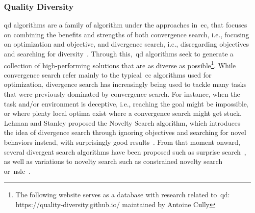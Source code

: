 \subsubsection{Quality Diversity} \label{sec:Backqd}

\acrfull{qd} algorithms are a family of algorithm under the approaches in~\acrlong{ec}, that focuses on combining the benefits and strengths of both convergence search, i.e., focusing on optimization and objective, and divergence search, i.e., disregarding objectives and searching for diversity~\cite{Pugh2016,Gaier2019-QDSteppingstones}. Through this,~\acrshort{qd} algorithms seek to generate a collection of high-performing solutions that are as diverse as possible\footnote{The following website serves as a database with research related to~\acrshort{qd}: https://quality-diversity.github.io/ maintained by Antoine Cully}. While convergence search refer mainly to the typical~\acrshort{ec} algorithms used for optimization, divergence search has increasingly being used to tackle many tasks that were previously dominated by convergence search. For instance, when the task and/or environment is deceptive, i.e., reaching the goal might be impossible, or where plenty local optima exist where a convergence search might get stuck. Lehman and Stanley proposed the Novelty Search algorithm, which introduces the idea of divergence search through ignoring objectives and searching for novel behaviors instead, with surprisingly good results~\cite{Novelty-Lehman2011,Lehman2010-MCNS}. From that moment onward, several divergent search algorithms have been proposed such as surprise search~\cite{Surprise-Gravina2016}, as well as variations to novelty search such as constrained novelty search~\cite{liapis2015-ConstrainedNoveltySearch} or~\acrfull{nslc}~\cite{Lehman2011-NSLC}.


